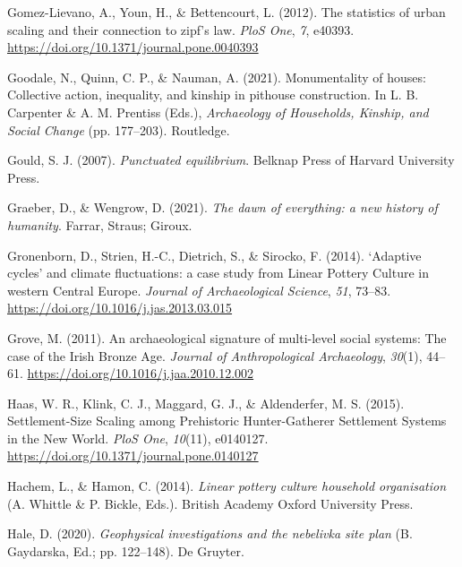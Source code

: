 \documentclass[
  12pt,
]{book}
\newlength{\cslhangindent}
\newlength{\cslentryspacingunit} %
\newenvironment{CSLReferences}[2] %
 {%
  \setlength{\parindent}{0pt}
  \ifodd #1
  \let\oldpar\par
  \def\par{\hangindent=\cslhangindent\oldpar}
  \fi
  \setlength{\parskip}{#2\cslentryspacingunit}
 }%
 {}
\begin{document}
\begin{CSLReferences}{1}{0}
\leavevmode{}%
Gomez-Lievano, A., Youn, H., \& Bettencourt, L. (2012). The statistics of urban scaling and their connection to zipf{'}s law. \emph{PloS One}, \emph{7}, e40393. \url{https://doi.org/10.1371/journal.pone.0040393}

\leavevmode{}%
Goodale, N., Quinn, C. P., \& Nauman, A. (2021). Monumentality of houses: {Collective} action, inequality, and kinship in pithouse construction. In L. B. Carpenter \& A. M. Prentiss (Eds.), \emph{Archaeology of {Households}, {Kinship}, and {Social Change}} (pp. 177--203). {Routledge}.

\leavevmode{}%
Gould, S. J. (2007). \emph{Punctuated equilibrium}. Belknap Press of Harvard University Press.

\leavevmode{}%
Graeber, D., \& Wengrow, D. (2021). \emph{The dawn of everything: a new history of humanity}. Farrar, Straus; Giroux.

\leavevmode{}%
Gronenborn, D., Strien, H.-C., Dietrich, S., \& Sirocko, F. (2014). {`}Adaptive cycles{'} and climate fluctuations: a case study from Linear Pottery Culture in western Central Europe. \emph{Journal of Archaeological Science}, \emph{51}, 73--83. \url{https://doi.org/10.1016/j.jas.2013.03.015}

\leavevmode{}%
Grove, M. (2011). An archaeological signature of multi-level social systems: The case of the Irish Bronze Age. \emph{Journal of Anthropological Archaeology}, \emph{30}(1), 44--61. \url{https://doi.org/10.1016/j.jaa.2010.12.002}

\leavevmode{}%
Haas, W. R., Klink, C. J., Maggard, G. J., \& Aldenderfer, M. S. (2015). Settlement-Size Scaling among Prehistoric Hunter-Gatherer Settlement Systems in the New World. \emph{PloS One}, \emph{10}(11), e0140127. \url{https://doi.org/10.1371/journal.pone.0140127}

\leavevmode{}%
Hachem, L., \& Hamon, C. (2014). \emph{Linear pottery culture household organisation} (A. Whittle \& P. Bickle, Eds.). British Academy Oxford University Press.

\leavevmode{}%
Hale, D. (2020). \emph{Geophysical investigations and the nebelivka site plan} (B. Gaydarska, Ed.; pp. 122--148). De Gruyter.


\end{CSLReferences}
\end{document}
